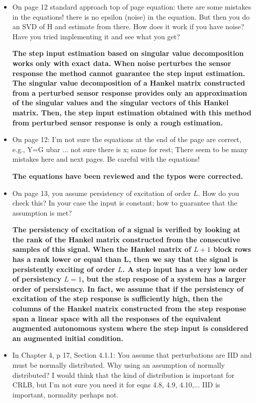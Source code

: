 \documentclass[11pt]{article}
\begin{document}
\begin{itemize}
	\item  On page 12 standard approach top of page equation: there are some mistakes in the equations! there is no epsilon (noise) in the equation. But then you do an SVD of H and estimate from there. How does it work if you have noise? Have you tried implementing it and see what you get?
	
	{\bfseries The step input estimation based on singular value decomposition works only with exact data. When  noise perturbes the sensor response the method cannot guarantee the step input estimation. The singular value decomposition of a Hankel matrix constructed from a perturbed sensor response provides only an approximation of the singular values and the singular vectors of this Hankel matrix. Then, the step input estimation obtained with this method from perturbed sensor response is only a rough estimation.     }
	
	\item  On page 12: I’m not sure the equations at the end of the page are correct, e.g., Y=G ubar ... not sure there is x; same for rest; There seem to be many mistakes here and next pages. Be careful with the equations!
	
	{\bfseries The equations have been reviewed and the typos were corrected.}
	
	\item  On page 13, you assume persistency of excitation of order $L$. How do you check this? In your case the input is constant; how to guarantee that the assumption is met?
	
	{\bfseries The persistency of excitation of a signal is verified by looking at the rank of the Hankel matrix constructed from the consecutive samples of this signal. When the Hankel matrix of $L+1$ block rows has a rank lower or equal than L, then we say that the signal is persistently exciting of order $L$. A step input has a very low order of persistency $L=1$, but the step respose of a system has a larger order of persistency. In fact, we assume that if the persistency of excitation of the step response is sufficiently high, then the columns of the Hankel matrix constructed from the step response span a linear space with all the responses of the equivalent augmented autonomous system where the step input is considered an augmented initial condition.}

	\item  In Chapter 4, p 17, Section 4.1.1: You assume that perturbations are IID and must be normally distributed. Why using an assumption of normally distributed? I would think that the kind of distribution is important for CRLB, but I’m not sure you need it for eqns 4.8, 4.9, 4.10,... IID is important, normality perhaps not.
	

\end{itemize}
\end{document}
